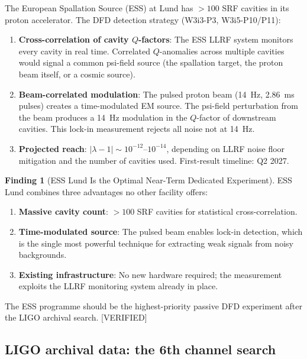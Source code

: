 \documentclass[11pt]{article}
\newcommand{\lam}{\lambda}
\newcommand{\lbone}{|\lam - 1|}
\theoremstyle{definition}
\newtheorem{finding}[theorem]{Finding}
\theoremstyle{remark}
\begin{document}
The European Spallation Source (ESS) at Lund has $>100$ SRF cavities
in its proton accelerator. The DFD detection strategy (W3i3-P3, W3i5-P10/P11):

\begin{enumerate}[nosep]
\item \textbf{Cross-correlation of cavity $Q$-factors}: The ESS LLRF system
  monitors every cavity in real time. Correlated $Q$-anomalies across
  multiple cavities would signal a common psi-field source (the spallation
  target, the proton beam itself, or a cosmic source).

\item \textbf{Beam-correlated modulation}: The pulsed proton beam (14~Hz,
  2.86~ms pulses) creates a time-modulated EM source. The psi-field
  perturbation from the beam produces a 14~Hz modulation in the $Q$-factor
  of downstream cavities. This lock-in measurement rejects all noise
  not at 14~Hz.

\item \textbf{Projected reach}: $\lbone \sim 10^{-12}$--$10^{-14}$,
  depending on LLRF noise floor mitigation and the number of cavities
  used. First-result timeline: Q2 2027.
\end{enumerate}

\begin{finding}[ESS Lund Is the Optimal Near-Term Dedicated Experiment]
\label{find:ESS_optimal}
ESS Lund combines three advantages no other facility offers:
\begin{enumerate}[nosep]
\item \textbf{Massive cavity count}: $>100$ SRF cavities for statistical
  cross-correlation.
\item \textbf{Time-modulated source}: The pulsed beam enables lock-in
  detection, which is the single most powerful technique for extracting
  weak signals from noisy backgrounds.
\item \textbf{Existing infrastructure}: No new hardware required; the
  measurement exploits the LLRF monitoring system already in place.
\end{enumerate}
The ESS programme should be the highest-priority passive DFD experiment
after the LIGO archival search. [VERIFIED]
\end{finding}

\subsection{LIGO archival data: the 6th channel search}
\label{ssec:LIGO}
\end{document}
